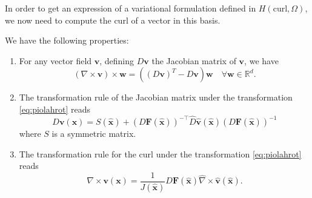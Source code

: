In order to get an expression of a variational formulation defined in  $H(\textrm{curl}, \Omega)$, we now need to compute the curl of a vector in this basis.
\begin{proposition}
We have the following properties:
\begin{enumerate}
\item For any vector field $ \mathbf{v} $, defining $D \mathbf{v}$ the Jacobian matrix of $\mathbf{v}$, we have
$$ (\nabla \times \mathbf{v})\times \mathbf{w} =  \left((D \mathbf{v})^T - D \mathbf{v}\right) \mathbf{w} \quad\forall \mathbf{w}\in \mathbb{R}^d.$$
\item The transformation rule of the Jacobian matrix under the transformation \eqref{eq:piolahrot} reads
$$ D \mathbf{v}( \mathbf{x}) = S( \hat{\mathbf{x}}) + (D \mathbf{F}( \hat{\mathbf{x}}))^{-\top} \hat{D} \hat{\mathbf{v}}
(\hat{\mathbf{x}})  (D \mathbf{F}( \hat{\mathbf{x}}))^{-1}$$
where $S$ is a symmetric matrix.
\item The transformation rule for the curl  under the transformation \eqref{eq:piolahrot} reads
\begin{equation}\label{eq:curltransf}
\nabla\times \mathbf{v} ( \mathbf{x}) = \frac{1}{J( \hat{\mathbf{x}})} D \mathbf{F}( \hat{\mathbf{x}}) \hat{\nabla}\times \hat{\mathbf{v}}( \hat{\mathbf{x}}).
\end{equation}
\end{enumerate}
\end{proposition}
 
